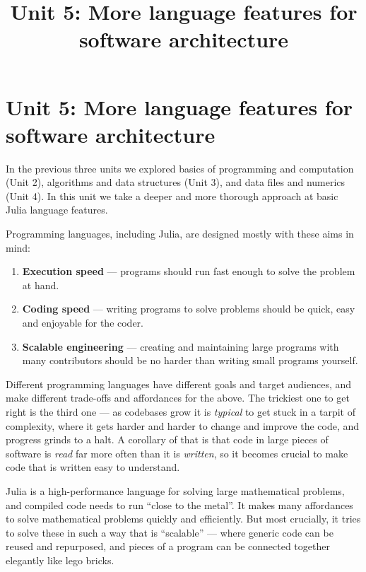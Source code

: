\documentclass[
]{article}
\title{Unit 5: More language features for software architecture}
\author{}
\date{}
\providecommand{\tightlist}{%
  \setlength{\itemsep}{0pt}\setlength{\parskip}{0pt}}
\renewcommand*\contentsname{Table of contents}
\newcommand\contentsname{Table of contents}
\begin{document}
\maketitle

\renewcommand*\contentsname{Table of contents}
{
\setcounter{tocdepth}{3}
\tableofcontents
}

\section{Unit 5: More language features for software
architecture}\label{unit-5-more-language-features-for-software-architecture}

In the previous three units we explored basics of programming and
computation (Unit 2), algorithms and data structures (Unit 3), and data
files and numerics (Unit 4). In this unit we take a deeper and more
thorough approach at basic Julia language features.

Programming languages, including Julia, are designed mostly with these
aims in mind:

\begin{enumerate}
\def\labelenumi{\arabic{enumi}.}
\tightlist
\item
  \textbf{Execution speed} --- programs should run fast enough to solve
  the problem at hand.
\item
  \textbf{Coding speed} --- writing programs to solve problems should be
  quick, easy and enjoyable for the coder.
\item
  \textbf{Scalable engineering} --- creating and maintaining large
  programs with many contributors should be no harder than writing small
  programs yourself.
\end{enumerate}

Different programming languages have different goals and target
audiences, and make different trade-offs and affordances for the above.
The trickiest one to get right is the third one --- as codebases grow it
is \emph{typical} to get stuck in a tarpit of complexity, where it gets
harder and harder to change and improve the code, and progress grinds to
a halt. A corollary of that is that code in large pieces of software is
\emph{read} far more often than it is \emph{written}, so it becomes
crucial to make code that is written easy to understand.

Julia is a high-performance language for solving large mathematical
problems, and compiled code needs to run ``close to the metal''. It
makes many affordances to solve mathematical problems quickly and
efficiently. But most crucially, it tries to solve these in such a way
that is ``scalable'' --- where generic code can be reused and
repurposed, and pieces of a program can be connected together elegantly
like lego bricks.
\end{document}
